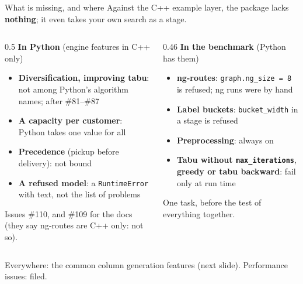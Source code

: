 \documentclass[aspectratio=169]{beamer}
\begin{document}
\begin{frame}{What is missing, and where}
  Against the C++ example layer, the package lacks \textbf{nothing}; it even takes your own search as a stage.

  \vspace{0.3em}
  \begin{columns}[T]
    \begin{column}{0.5\textwidth}
      \textbf{In Python} (engine features in C++ only)
      \begin{itemize}\footnotesize
        \item \textbf{Diversification, improving tabu}: not among Python's algorithm names; after \#81--\#87
        \item \textbf{A capacity per customer}: Python takes one value for all
        \item \textbf{Precedence} (pickup before delivery): not bound
        \item \textbf{A refused model}: a \texttt{RuntimeError} with text, not the list of problems
      \end{itemize}
      \scriptsize Issues \#110, and \#109 for the docs (they say ng-routes are C++ only: not so).
    \end{column}
    \begin{column}{0.46\textwidth}
      \textbf{In the benchmark} (Python has them)
      \begin{itemize}\footnotesize
        \item \textbf{ng-routes}: \texttt{graph.ng\_size = 8} is refused; ng runs were by hand
        \item \textbf{Label buckets}: \texttt{bucket\_width} in a stage is refused
        \item \textbf{Preprocessing}: always on
        \item \textbf{Tabu without \texttt{max\_iterations}}, \textbf{greedy or tabu backward}: fail only at run
          time
      \end{itemize}
      \scriptsize One task, before the test of everything together.
    \end{column}
  \end{columns}

  \vspace{0.4em}
  \footnotesize Everywhere: the common column generation features (next slide). Performance issues: filed.
\end{frame}
\end{document}
